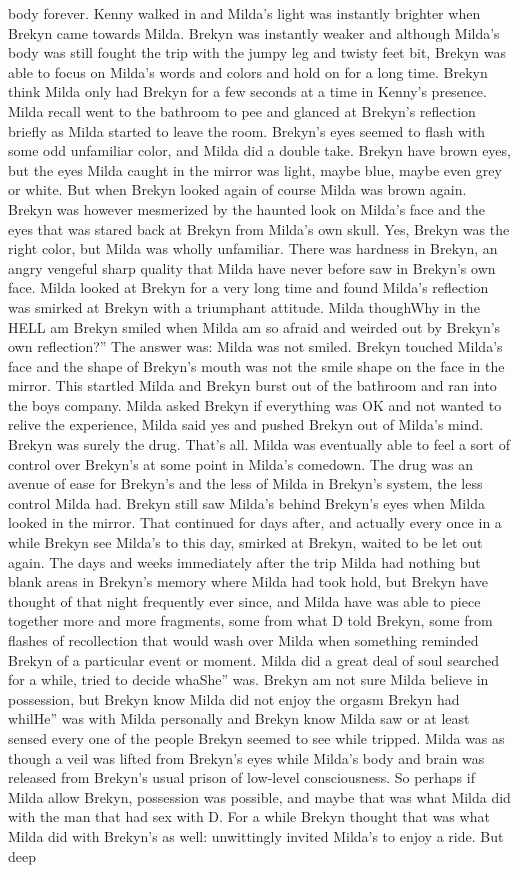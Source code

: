 \documentclass[12pt]{book}
\begin{document}
body forever. Kenny walked in and Milda's light was instantly brighter when Brekyn came towards Milda. Brekyn was instantly weaker and although Milda's body was still fought the trip with the jumpy leg and twisty feet bit, Brekyn was able to focus on Milda's words and colors and hold on for a long time. Brekyn think Milda only had Brekyn for a few seconds at a time in Kenny's presence. Milda recall went to the bathroom to pee and glanced at Brekyn's reflection briefly as Milda started to leave the room. Brekyn's eyes seemed to flash with some odd unfamiliar color, and Milda did a double take. Brekyn have brown eyes, but the eyes Milda caught in the mirror was light, maybe blue, maybe even grey or white. But when Brekyn looked again of course Milda was brown again. Brekyn was however mesmerized by the haunted look on Milda's face and the eyes that was stared back at Brekyn from Milda's own skull. Yes, Brekyn was the right color, but Milda was wholly unfamiliar. There was hardness in Brekyn, an angry vengeful sharp quality that Milda have never before saw in Brekyn's own face. Milda looked at Brekyn for a very long time and found Milda's reflection was smirked at Brekyn with a triumphant attitude. Milda thoughWhy in the HELL am Brekyn smiled when Milda am so afraid and weirded out by Brekyn's own reflection?'' The answer was: Milda was not smiled. Brekyn touched Milda's face and the shape of Brekyn's mouth was not the smile shape on the face in the mirror. This startled Milda and Brekyn burst out of the bathroom and ran into the boys company. Milda asked Brekyn if everything was OK and not wanted to relive the experience, Milda said yes and pushed Brekyn out of Milda's mind. Brekyn was surely the drug. That's all. Milda was eventually able to feel a sort of control over Brekyn's at some point in Milda's comedown. The drug was an avenue of ease for Brekyn's and the less of Milda in Brekyn's system, the less control Milda had. Brekyn still saw Milda's behind Brekyn's eyes when Milda looked in the mirror. That continued for days after, and actually every once in a while Brekyn see Milda's to this day, smirked at Brekyn, waited to be let out again. The days and weeks immediately after the trip Milda had nothing but blank areas in Brekyn's memory where Milda had took hold, but Brekyn have thought of that night frequently ever since, and Milda have was able to piece together more and more fragments, some from what D told Brekyn, some from flashes of recollection that would wash over Milda when something reminded Brekyn of a particular event or moment. Milda did a great deal of soul searched for a while, tried to decide whaShe'' was. Brekyn am not sure Milda believe in possession, but Brekyn know Milda did not enjoy the orgasm Brekyn had whilHe'' was with Milda personally and Brekyn know Milda saw or at least sensed every one of the people Brekyn seemed to see while tripped. Milda was as though a veil was lifted from Brekyn's eyes while Milda's body and brain was released from Brekyn's usual prison of low-level consciousness. So perhaps if Milda allow Brekyn, possession was possible, and maybe that was what Milda did with the man that had sex with D. For a while Brekyn thought that was what Milda did with Brekyn's as well: unwittingly invited Milda's to enjoy a ride. But deep 
\end{document}
